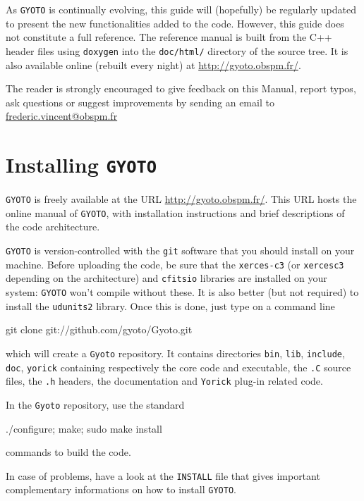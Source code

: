 \documentclass[a4paper,12pt]{article}
\begin{document}
As \texttt{GYOTO} is continually evolving, this guide will (hopefully) be regularly updated to present the new functionalities added to the code. However, this guide does not constitute a full reference. The reference manual is built from the C++ header files using \texttt{doxygen} into the \texttt{doc/html/} directory of the source tree. It is also available online (rebuilt every night) at \url{http://gyoto.obspm.fr/}.

The reader is strongly encouraged to give feedback on this Manual, report typos, ask questions or suggest improvements by sending an email to \url{frederic.vincent@obspm.fr}

\tableofcontents



\newpage

\section{Installing \texttt{GYOTO}}
\label{install}

\texttt{GYOTO} is freely available at the URL \url{http://gyoto.obspm.fr/}. This URL hosts the online manual of \texttt{GYOTO}, with installation instructions and brief descriptions of the code architecture.

\texttt{GYOTO} is version-controlled with the \texttt{git} software that you should install on your machine.
Before uploading the code, be sure that the \texttt{xerces-c3} (or \texttt{xercesc3} depending on the
architecture) and \texttt{cfitsio} libraries are installed on your system: \texttt{GYOTO} won't compile without these.
It is also better (but not required) to install the \texttt{udunits2} library. Once this is done, just type on a command line
\begin{code}
git clone git://github.com/gyoto/Gyoto.git
\end{code}  
which will create a \texttt{Gyoto} repository. It contains directories \texttt{bin}, \texttt{lib}, \texttt{include}, \texttt{doc}, \texttt{yorick}
containing respectively the core code and executable, the \texttt{.C} source files, the \texttt{.h} headers, the documentation
and \texttt{Yorick} plug-in related code. 

In the \texttt{Gyoto} repository, use the standard 
\begin{code}
./configure; make; sudo make install 
\end{code}
commands
to build the code.

In case of problems, have a look at the \texttt{INSTALL} file that gives important complementary informations on how to install \texttt{GYOTO}.
\end{document}
